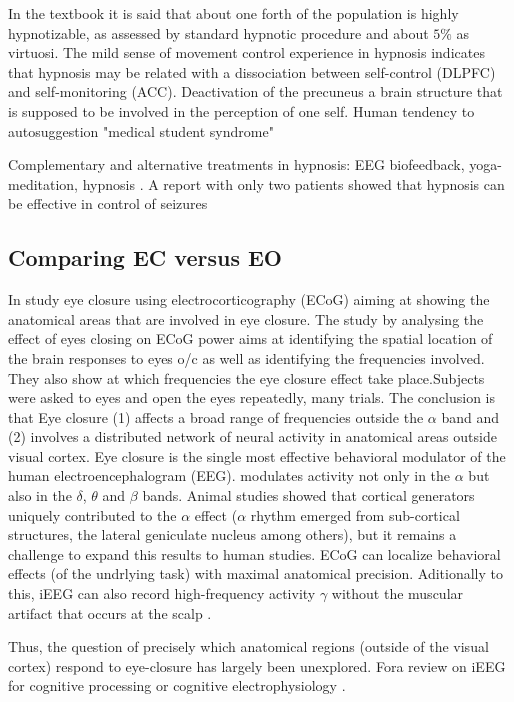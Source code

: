\documentclass[11pt, onecolumn]{article}
\begin{document}
In the textbook \citep{baars_cognition_2010} it is said that about one forth of the population is highly hypnotizable, as assessed by standard hypnotic procedure and about $5\%$ as virtuosi.
The mild sense of movement control experience in hypnosis indicates that hypnosis may be related with a dissociation between self-control (DLPFC) and self-monitoring (ACC). Deactivation of the precuneus a brain structure that is supposed to be involved in the perception of one self.
Human tendency to autosuggestion "medical student syndrome"

Complementary and alternative treatments in hypnosis: EEG biofeedback, yoga-meditation, hypnosis \citep{shorvon_treatment_2008}. A report with only two patients showed that hypnosis can be effective in control of seizures

\subsection{Comparing EC versus EO}
In \citep{geller2014eye} study eye closure using electrocorticography (ECoG) aiming at showing the anatomical areas that are involved in eye closure. The study by analysing the effect of eyes closing on ECoG power aims at identifying the spatial location of the brain responses to eyes o/c as well as identifying the frequencies involved. 
They also show at which frequencies the eye closure effect take place.Subjects were asked to eyes and open the eyes repeatedly, many trials. The conclusion is that Eye closure (1) affects a broad range of frequencies outside the $\alpha$ band and (2) involves a distributed network of neural activity in anatomical areas outside visual cortex.
Eye closure is the single most effective behavioral modulator of the human electroencephalogram (EEG). modulates activity not only in the $\alpha$ but also in the $\delta$, $\theta$ and $\beta$ bands. Animal studies showed that  cortical generators uniquely contributed to the $\alpha$ effect ($\alpha$ rhythm emerged from sub-cortical structures, the lateral geniculate nucleus among others), but it remains a challenge to expand this results to human studies. 
ECoG can localize behavioral effects (of the undrlying task) with maximal anatomical precision. Aditionally to this, iEEG can also record high-frequency activity $\gamma$ without the muscular artifact that occurs at the scalp \citep{yuval2008transient}.

Thus, the question of precisely which anatomical regions (outside of the visual cortex) respond to eye-closure has largely been unexplored.
Fora review on iEEG for cognitive processing or cognitive electrophysiology \citep{jacobs2010direct}. 
\end{document}
